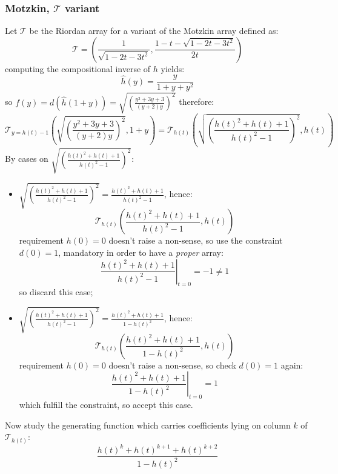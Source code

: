 \subsubsection{Motzkin, $\mathcal{T}$ variant}

Let $\mathcal{T}$ be the Riordan array for a variant
of the Motzkin array defined as:
\begin{displaymath} 
    \mathcal{T} = \left(\frac{1}{\sqrt{1-2t-3t^2}}, 
       \frac{1-t-\sqrt{1-2t-3t^2}}{2t}  \right)
\end{displaymath} 
computing the compositional inverse of $h$ yields:
\begin{displaymath} 
    \hat{h}(y) = \frac{y}{1+y+y^2}
\end{displaymath} 
so $f(y)=d(\hat{h}(1+y))=\sqrt{\left(\frac{y^2+3y+3}{(y+2)y}\right)^{2}}$ therefore:
\begin{displaymath} 
    \mathcal{T}_{y=h(t)-1}\left( \sqrt{\left(\frac{y^2+3y+3}{(y+2)y}\right)^{2}}, 1+y \right) = 
        \mathcal{T}_{h(t)}\left( \sqrt{\left(\frac{h(t)^2+h(t)+1}{h(t)^2-1}\right)^{2}}, h(t) \right) 
\end{displaymath} 
By cases on $\sqrt{\left(\frac{h(t)^2+h(t)+1}{h(t)^2-1}\right)^{2}}$:
\begin{itemize}
    \item $\sqrt{\left(\frac{h(t)^2+h(t)+1}{h(t)^2-1}\right)^{2}}=\frac{h(t)^2+h(t)+1}{h(t)^2-1}$, hence:
        \begin{displaymath} 
            \mathcal{T}_{h(t)}\left(\frac{h(t)^2+h(t)+1}{h(t)^2-1}, h(t) \right)
        \end{displaymath} 
        requirement $h(0)=0$ doesn't raise a non-sense, so use the 
        constraint $d(0)=1$, mandatory in order to have a \emph{proper} array:
        \begin{displaymath}
            \left. \frac{h(t)^2+h(t)+1}{h(t)^2-1} \right|_{t=0} = -1 \not= 1 
        \end{displaymath} 
        so discard this case;
    \item $\sqrt{\left(\frac{h(t)^2+h(t)+1}{h(t)^2-1}\right)^{2}}=\frac{h(t)^2+h(t)+1}{1-h(t)^2}$, hence:
        \begin{displaymath}
            \mathcal{T}_{h(t)}\left(\frac{h(t)^2+h(t)+1}{1-h(t)^2}, h(t) \right)
        \end{displaymath} 
        requirement $h(0)=0$ doesn't raise a non-sense, so check $d(0)=1$ again:
        \begin{displaymath}
            \left. \frac{h(t)^2+h(t)+1}{1-h(t)^2} \right|_{t=0} = 1 
        \end{displaymath} 
        which fulfill the constraint, so accept this case.
\end{itemize}
Now study the generating function which carries coefficients lying on column $k$
of $\mathcal{T}_{h(t)}$:
\begin{displaymath} 
    \frac{h(t)^{k}+h(t)^{k+1}+h(t)^{k+2}}{1-h(t)^2 }
\end{displaymath} 


